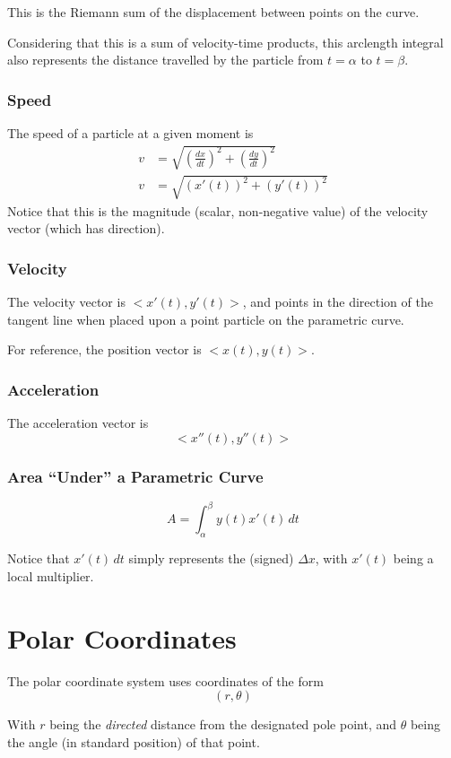 \documentclass{article}
\begin{document}
This is the Riemann sum of the displacement between points on the curve.

Considering that this is a sum of velocity-time products, this arclength integral also represents the distance travelled by the particle from $t=\alpha$ to $t=\beta$.

\subsubsection{Speed}
The speed of a particle at a given moment is
\begin{align*}
    v &= \sqrt{\left(\frac{dx}{dt}\right)^2 + \left(\frac{dy}{dt}\right)^2} \\
    v &= \sqrt{(x'(t))^2 + (y'(t))^2}
\end{align*}
Notice that this is the magnitude (scalar, non-negative value) of the velocity vector (which has direction).

\subsubsection{Velocity}
The velocity vector is $<x'(t), y'(t)>$, and points in the direction of the tangent line when placed upon a point particle on the parametric curve.

For reference, the position vector is $<x(t), y(t)>$.

\subsubsection{Acceleration}
The acceleration vector is
$$<x''(t), y''(t)>$$

\subsubsection{Area ``Under'' a Parametric Curve}
$$A = \int_{\alpha}^{\beta} y(t) x'(t) \,dt$$

Notice that $x'(t) \,dt$ simply represents the (signed) $\Delta x$, with $x'(t)$ being a local multiplier.

\section{Polar Coordinates}
The polar coordinate system uses coordinates of the form
$$(r, \theta)$$

With $r$ being the \emph{directed} distance from the designated pole point, and $\theta$ being the angle (in standard position) of that point.
\end{document}
